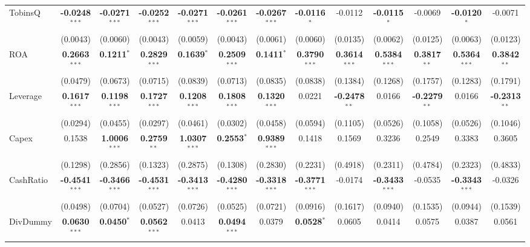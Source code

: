 \begin{landscape}
\begin{table}[H]
\begin{tabular}{lcccccccccccc}
TobinsQ & \textbf{-0.0248}$^{***}$ & \textbf{-0.0271}$^{***}$ & \textbf{-0.0252}$^{***}$ & \textbf{-0.0271}$^{***}$ & \textbf{-0.0261}$^{***}$ & \textbf{-0.0267}$^{***}$ & \textbf{-0.0116}$^{*}$ & -0.0112 & \textbf{-0.0115}$^{*}$ & -0.0069 & \textbf{-0.0120}$^{*}$ & -0.0071 \\
 & (0.0043) & (0.0060) & (0.0043) & (0.0059) & (0.0043) & (0.0061) & (0.0060) & (0.0135) & (0.0062) & (0.0125) & (0.0063) & (0.0123) \\
ROA & \textbf{0.2663}$^{***}$ & \textbf{0.1211}$^{*}$ & \textbf{0.2829}$^{***}$ & \textbf{0.1639}$^{*}$ & \textbf{0.2509}$^{***}$ & \textbf{0.1411}$^{*}$ & \textbf{0.3790}$^{***}$ & \textbf{0.3614}$^{***}$ & \textbf{0.5384}$^{***}$ & \textbf{0.3817}$^{**}$ & \textbf{0.5364}$^{***}$ & \textbf{0.3842}$^{**}$ \\
 & (0.0479) & (0.0673) & (0.0715) & (0.0839) & (0.0713) & (0.0835) & (0.0838) & (0.1384) & (0.1268) & (0.1757) & (0.1283) & (0.1791) \\
Leverage & \textbf{0.1617}$^{***}$ & \textbf{0.1198}$^{***}$ & \textbf{0.1727}$^{***}$ & \textbf{0.1208}$^{***}$ & \textbf{0.1808}$^{***}$ & \textbf{0.1320}$^{***}$ & 0.0221 & \textbf{-0.2478}$^{**}$ & 0.0166 & \textbf{-0.2279}$^{**}$ & 0.0166 & \textbf{-0.2313}$^{**}$ \\
 & (0.0294) & (0.0455) & (0.0297) & (0.0461) & (0.0302) & (0.0458) & (0.0594) & (0.1105) & (0.0526) & (0.1058) & (0.0526) & (0.1046) \\
Capex & 0.1538 & \textbf{1.0006}$^{***}$ & \textbf{0.2759}$^{**}$ & \textbf{1.0307}$^{***}$ & \textbf{0.2553}$^{*}$ & \textbf{0.9389}$^{***}$ & 0.1418 & 0.1569 & 0.3236 & 0.2549 & 0.3383 & 0.3605 \\
 & (0.1298) & (0.2856) & (0.1323) & (0.2875) & (0.1308) & (0.2830) & (0.2231) & (0.4918) & (0.2311) & (0.4784) & (0.2323) & (0.4833) \\
CashRatio & \textbf{-0.4541}$^{***}$ & \textbf{-0.3466}$^{***}$ & \textbf{-0.4531}$^{***}$ & \textbf{-0.3413}$^{***}$ & \textbf{-0.4280}$^{***}$ & \textbf{-0.3318}$^{***}$ & \textbf{-0.3771}$^{***}$ & -0.0174 & \textbf{-0.3433}$^{***}$ & -0.0535 & \textbf{-0.3343}$^{***}$ & -0.0326 \\
 & (0.0498) & (0.0704) & (0.0527) & (0.0726) & (0.0525) & (0.0721) & (0.0916) & (0.1617) & (0.0940) & (0.1535) & (0.0944) & (0.1539) \\
DivDummy & \textbf{0.0630}$^{***}$ & \textbf{0.0450}$^{*}$ & \textbf{0.0562}$^{***}$ & 0.0413 & \textbf{0.0494}$^{***}$ & 0.0379 & \textbf{0.0528}$^{*}$ & 0.0605 & 0.0414 & 0.0575 & 0.0387 & 0.0561 \\

\end{tabular}
\end{table}
\end{landscape}
